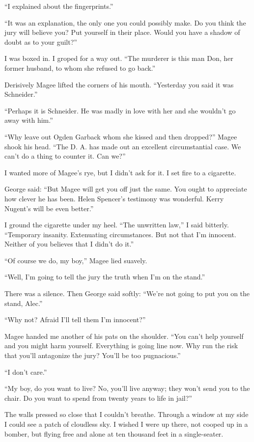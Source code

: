 \documentclass{novel}
\begin{document}
{“I explained about the fingerprints.”

“It was an explanation, the only one you could possibly make. Do you think the jury will believe you? Put yourself in their place. Would you have a shadow of doubt as to your guilt?”

I was boxed in. I groped for a way out. “The murderer is this man Don, her former husband, to whom she refused to go back.”

Derisively Magee lifted the corners of his mouth. “Yesterday you said it was Schneider.”

“Perhaps it is Schneider. He was madly in love with her and she wouldn’t go away with him.”

“Why leave out Ogden Garback whom she kissed and then dropped?” Magee shook his head. “The D. A. has made out an excellent circumstantial case. We can’t do a thing to counter it. Can we?”

I wanted more of Magee’s rye, but I didn’t ask for it. I set fire to a cigarette.

George said: “But Magee will get you off just the same. You ought to appreciate how clever he has been. Helen Spencer’s testimony was wonderful. Kerry Nugent’s will be even better.”

I ground the cigarette under my heel. “The unwritten law,” I said bitterly. “Temporary insanity. Extenuating circumstances. But not that I’m innocent. Neither of you believes that I didn’t do it.”

“Of course we do, my boy,” Magee lied suavely.

“Well, I’m going to tell the jury the truth when I’m on the stand.”

There was a silence. Then George said softly: “We’re not going to put you on the stand, Alec.”

“Why not? Afraid I’ll tell them I’m innocent?”

Magee handed me another of his pats on the shoulder. “You can’t help yourself and you might harm yourself. Everything is going line now. Why run the risk that you’ll antagonize the jury? You’ll be too pugnacious.”

“I don’t care.”

“My boy, do you want to live? No, you’ll live anyway; they won’t send you to the chair. Do you want to spend from twenty years to life in jail?”

The walls pressed so close that I couldn’t breathe. Through a window at my side I could see a patch of cloudless sky. I wished I were up there, not cooped up in a bomber, but flying free and alone at ten thousand feet in a single-seater.

}
\end{document}
